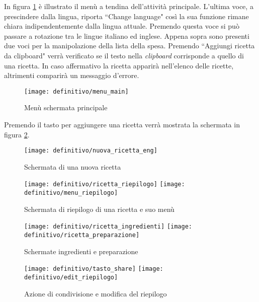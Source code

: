 In figura \ref{fig:def_main_2} è illustrato il menù a tendina dell'attività principale.
L'ultima voce, a prescindere dalla lingua, riporta ``Change language" così la sua funzione rimane chiara indipendentemente dalla lingua attuale.
Premendo questa voce si può passare a rotazione tra le lingue italiano ed inglese.
Appena sopra sono presenti due voci per la manipolazione della lista della spesa.
Premendo ``Aggiungi ricetta da clipboard" verrà verificato se il testo nella \textit{clipboard} corrisponde a quello di una ricetta.
In caso affermativo la ricetta apparirà nell'elenco delle ricette, altrimenti comparirà un messaggio d'errore.

\begin{figure}[ht]
  \begin{center}
    \texttt{[image: definitivo/menu\_main]}
    \caption{Menù schermata principale}
    \label{fig:def_main_2}
  \end{center}
\end{figure}
\clearpage

Premendo il tasto per aggiungere una ricetta verrà mostrata la schermata in figura \ref{fig:def_nuova}.
\begin{figure}[ht]
  \begin{center}
    \texttt{[image: definitivo/nuova\_ricetta\_eng]}
    \caption{Schermata di una nuova ricetta}
    \label{fig:def_nuova}
  \end{center}
\end{figure}

\begin{figure}[ht]
  \begin{center}
    \texttt{[image: definitivo/ricetta\_riepilogo]}
    \texttt{[image: definitivo/menu\_riepilogo]}
    \caption{Schermata di riepilogo di una ricetta e suo menù}
    \label{fig:def_ricetta}
  \end{center}
\end{figure}

\begin{figure}[ht]
  \begin{center}
    \texttt{[image: definitivo/ricetta\_ingredienti]}
    \texttt{[image: definitivo/ricetta\_preparazione]}
    \caption{Schermate ingredienti e preparazione}
    \label{fig:def_ricetta_1}
  \end{center}
\end{figure}

\begin{figure}[ht]
   \begin{center}
    \texttt{[image: definitivo/tasto\_share]}
    \texttt{[image: definitivo/edit\_riepilogo]}
    \caption{Azione di condivisione e modifica del riepilogo}
    \label{fig:def_ricetta_2}
  \end{center}
\end{figure}

